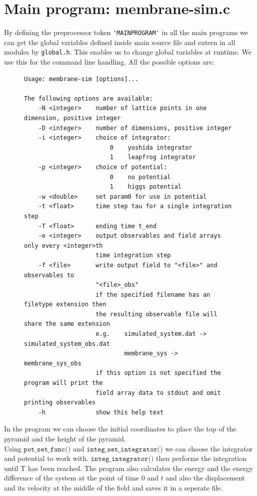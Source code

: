 \documentclass[11pt,a4paper]{article}
\begin{document}
\section{Main program: membrane-sim.c}

By defining the preprocessor token \verb|'MAINPROGRAM'| in all the main programs
we can get the global variables defined inside main source file and extern in
all modules by \verb|global.h|.
This enables us to change global variables at runtime. We use this for the
command line handling. All the possible options are:

\begin{figure}[H]
	\begin{lstlisting}
Usage: membrane-sim [options]...

The following options are available:
    -N <integer>    number of lattice points in one dimension, positive integer
    -D <integer>    number of dimensions, positive integer
    -i <integer>    choice of integrator:
                        0    yoshida integrator
                        1    leapfrog integrator
    -p <integer>    choice of potential:
                        0    no potential
                        1    higgs potential
    -w <double>     set param0 for use in potential
    -t <float>      time step tau for a single integration step
    -T <float>      ending time t_end
    -e <integer>    output observables and field arrays only every <integer>th
                    time integration step
    -f <file>       write output field to "<file>" and observables to
                    "<file>_obs"
                    if the specified filename has an filetype extension then
                    the resulting observable file will share the same extension
                    e.g.    simulated_system.dat -> simulated_system_obs.dat
                            membrane_sys -> membrane_sys_obs
                    if this option is not specified the program will print the
                    field array data to stdout and omit printing observables
    -h              show this help text
	\end{lstlisting}
\end{figure}

In the program we can choose the initial coordinates to place the top of the pyramid and the height of the pyramid. \\
Using $\texttt{pot\_set\_func()}$ and $\texttt{integ\_set\_integrator()}$ we can choose the integrator and potential to work with. $\texttt{integ\_integrator()}$ then performs the integration until T has been reached. The program also calculates the energy and the energy difference of the system at the point of time 0 and $t$ and also the displacement and its velocity at the middle of the field and saves it in a seperate file.
\end{document}
